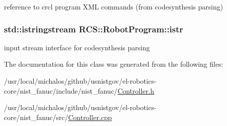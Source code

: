 reference to crcl program X\-M\-L commands (from codesynthesis parsing) \hypertarget{classRCS_1_1RobotProgram_a0099964c452870619bd0ee7651ffb072}{
\subsubsection[{istr}]{\setlength{\rightskip}{0pt plus 5cm}std\-::istringstream R\-C\-S\-::\-Robot\-Program\-::istr}}\label{classRCS_1_1RobotProgram_a0099964c452870619bd0ee7651ffb072}
input stream interface for codesynthesis parsing 

The documentation for this class was generated from the following files\-:\begin{DoxyCompactItemize}
\item 
/usr/local/michalos/github/usnistgov/el-\/robotics-\/core/nist\-\_\-fanuc/include/nist\-\_\-fanuc/\hyperlink{Controller_8h}{Controller.\-h}\item 
/usr/local/michalos/github/usnistgov/el-\/robotics-\/core/nist\-\_\-fanuc/src/\hyperlink{Controller_8cpp}{Controller.\-cpp}\end{DoxyCompactItemize}
